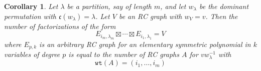 \documentclass{amsart}
\newtheorem{corollary}[lemma]{Corollary}
\newtheorem{theorem}{Theorem}[section]
\theoremstyle{definition}
\theoremstyle{remark}
\numberwithin{equation}{subsection}
\newcommand{\wof}[1]{w_{#1}}
\newcommand{\wtt}{\mathtt{wt}}
\newcommand{\code}{\mathfrak{c}}
\newcommand{\maxd}{\mathfrak{m}}
\begin{document}



\begin{corollary}
Let $\lambda$ be a partition, say of length $m$, and let $w_\lambda$ be the dominant permutation with $\code(w_\lambda)=\lambda$. Let $V$ be an RC graph with $\wof{V} = v$. Then the number of factorizations of the form
$$E_{i_m, \lambda_m}\boxtimes\cdots \boxtimes E_{i_1, \lambda_1} = V$$
where $E_{p,k}$ is an arbitrary RC graph for an elementary symmetric polynomial in $k$ variables of degree $p$ is equal to the number of RC graphs $A$ for $vw_{\lambda}^{-1}$ with 
$$\wtt(A) = (i_1,\ldots,i_m)$$
\end{corollary}
\end{document}
